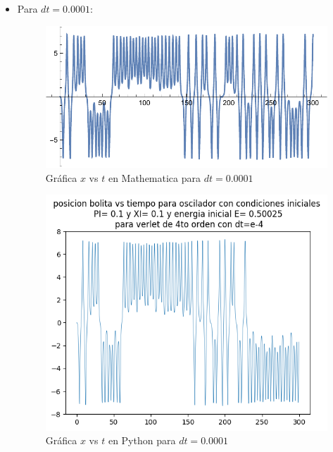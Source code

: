\documentclass[idxtotoc,hyperref,openany]{labbook} %
\begin{document}
\begin{itemize}
\item Para $dt=0.0001$:

\begin{figure}[H] %
\begin{center}
\includegraphics[width=1\linewidth]{discensopara0-0001.pdf}
\end{center}
\caption{Gráfica $x$ vs $t$ en Mathematica para $dt=0.0001$}
\label{graficamathematica2}
\end{figure}

\begin{figure}[H] %
\begin{center}
\includegraphics[width=1\linewidth]{0verlet_dt_0-0001_x_vs_t_bolita.png}
\end{center}
\caption{Gráfica $x$ vs $t$ en Python para $dt=0.0001$}
\label{graficapython1}
\end{figure}
\end{itemize}
\end{document}
